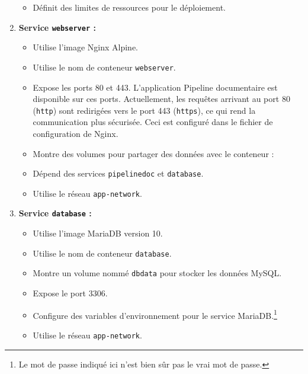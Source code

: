 \begin{enumerate}
\begin{itemize}
              \item Définit des limites de ressources pour le déploiement.
          \end{itemize}
    \item \cprotect\textbf{Service \Verb|webserver| :}
          \begin{itemize}
              \item Utilise l'image Nginx Alpine.
              \item Utilise le nom de conteneur \Verb|webserver|.
              \item Expose les ports 80 et 443. L'application Pipeline documentaire est disponible sur ces ports. Actuellement, les requêtes arrivant au port 80 (\Verb|http|) sont redirigées vers le port 443 (\Verb|https|), ce qui rend la communication plus sécurisée. Ceci est configuré dans le fichier de configuration de Nginx.
              \item Montre des volumes pour partager des données avec le conteneur :
              \item Dépend des services \Verb|pipelinedoc| et \Verb|database|.
              \item Utilise le réseau \Verb|app-network|.
          \end{itemize}
    \item \cprotect\textbf{Service \Verb|database| :}
          \begin{itemize}
              \item Utilise l'image MariaDB version 10.
              \item Utilise le nom de conteneur \Verb|database|.
              \item Montre un volume nommé \Verb|dbdata| pour stocker les données MySQL.
              \item Expose le port 3306.
              \item Configure des variables d'environnement pour le service MariaDB.\footnote{Le mot de passe indiqué ici n'est bien sûr pas le vrai mot de passe.}
              \item Utilise le réseau \Verb|app-network|.
          \end{itemize}
\end{enumerate}


